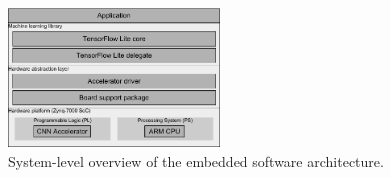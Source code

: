 \begin{figure}[t!]
	\centering
	\includegraphics[width=0.5\textwidth]{../figures/sw_stack.pdf}
	\caption{System-level overview of the embedded software architecture.}
	\label{fig:sw_stack}
\end{figure}

